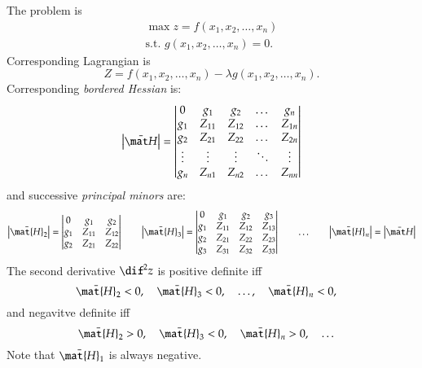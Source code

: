 \documentclass[a4paper]{article}
\numberwithin{equation}{subsection}
\begin{document}
The problem is
\begin{equation}
  \begin{split}
    \max z = f(x_1, x_2, \dots, x_n)\\
    \text{s.t. } 
    g(x_1, x_2, \dots, x_n) = 0.
  \end{split}
\end{equation}
Corresponding Lagrangian is
\begin{equation}
  Z = f(x_1, x_2, \dots, x_n) - \lambda g(x_1, x_2, \dots, x_n).
\end{equation}
Corresponding \emph{bordered Hessian} is:
\begin{equation}
  \begin{vmatrix}
    \bar{\mat H}
  \end{vmatrix}
  =
  \begin{vmatrix}
    0   & g_1    & g_2    & \dots & g_n\\
    g_1 & Z_{11} & Z_{12} & \dots & Z_{1n}\\
    g_2 & Z_{21} & Z_{22} & \dots & Z_{2n}\\
    \vdots & \vdots & \vdots & \ddots & \vdots \\
    g_n & Z_{n1} & Z_{n2} & \dots & Z_{nn}
  \end{vmatrix}
\end{equation}
and successive \emph{principal minors} are:
\begin{equation}
  \begin{vmatrix}
    \bar{\mat{H}}_2
  \end{vmatrix}
  =
  \begin{vmatrix}
    0   & g_1    & g_2\\
    g_1 & Z_{11} & Z_{12}\\
    g_2 & Z_{21} & Z_{22}
  \end{vmatrix}
  \qquad
  \begin{vmatrix}
    \bar{\mat{H}}_3
  \end{vmatrix}
  =
  \begin{vmatrix}
    0   & g_1    & g_2    & g_3\\
    g_1 & Z_{11} & Z_{12} & Z_{13}\\
    g_2 & Z_{21} & Z_{22} & Z_{23}\\
    g_3 & Z_{31} & Z_{32} & Z_{33}
  \end{vmatrix}
  \qquad
  \dots
  \qquad
  \begin{vmatrix}
    \bar{\mat{H}}_n 
  \end{vmatrix}
  =
  \begin{vmatrix}
    \bar{\mat H}
  \end{vmatrix}
\end{equation}
The second derivative $\dif^2 z$ is positive definite iff
\begin{equation*}
  \bar{\mat{H}}_2 < 0,
  \quad
  \bar{\mat{H}}_3 < 0,
  \quad
  \dots,
  \quad
  \bar{\mat{H}}_n < 0,
  \quad
\end{equation*}
and negavitve definite iff
\begin{equation*}
  \bar{\mat{H}}_2 > 0,
  \quad
  \bar{\mat{H}}_3 < 0,
  \quad
  \bar{\mat{H}}_n > 0,
  \quad
  \dots
  \quad
\end{equation*}
Note that $\bar{\mat{H}}_1$ is always negative.
\end{document}
